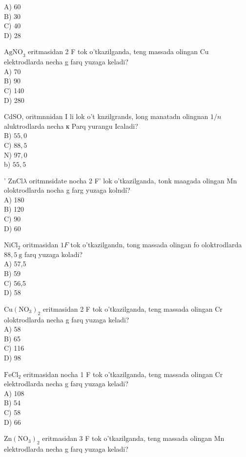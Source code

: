 A) 60\\
B) 30\\
C) 40\\
D) 28
  \item $\mathrm{AgNO}_{3}$ eritmasidan 2 F tok o'tkazilganda, teng massada olingan Cu elektrodlarda necha g farq yuzaga keladi?\\
A) 70\\
B) 90\\
C) 140\\
D) 280
  \item CdSO, oritmnnidan I li lok o't knzilgrands, long manatadn olingnan $1 / n$ aluktrodlarda necha к Parq yurangu Icaladi?\\
B) $55,0$\\
C) $88,5$\\
N) $97,0$\\
b) $55,5$
  \item ' $\mathrm{ZnCl} \lambda$ oritmnsidate nocha 2 F' lok o'tkazilganda, tonk maagada olingan Mn oloktrodlarda nocha g farg yuzaga kolndí?\\
A) 180\\
B) 120\\
C) 90\\
D) 60
  \item $\mathrm{NiCl}_{2}$ oritmasidan $1 F$ tok o'tkazilgandn, tong massada olingan fo oloktrodlarda $88,5 \mathrm{~g}$ farq yuzaga koladi?\\
A) 57,5\\
B) 59\\
C) 56,5\\
D) 58
  \item $\mathrm{Cu}\left(\mathrm{NO}_{3}\right)_{2}$ eritmasidan 2 F tok o'tkazilganda, teng massada olingan Cr oloktrodlarda necha g farq yuzaga keladi?\\
A) 58\\
B) 65\\
C) 116\\
D) 98
  \item $\mathrm{FeCl}_{2}$ eritmasidan nocha 1 F tok o'tkazilganda, teng massada olingan Cr elektrodlarda necha g farq yuzaga keladi?\\
A) 108\\
B) 54\\
C) 58\\
D) 66
  \item $\mathrm{Zn}\left(\mathrm{NO}_{3}\right)_{2}$ eritmasidan 3 F tok o'tkazilganda, teng massada olingan Mn elektrodlarda necha g farq yuzaga keladi?\\
